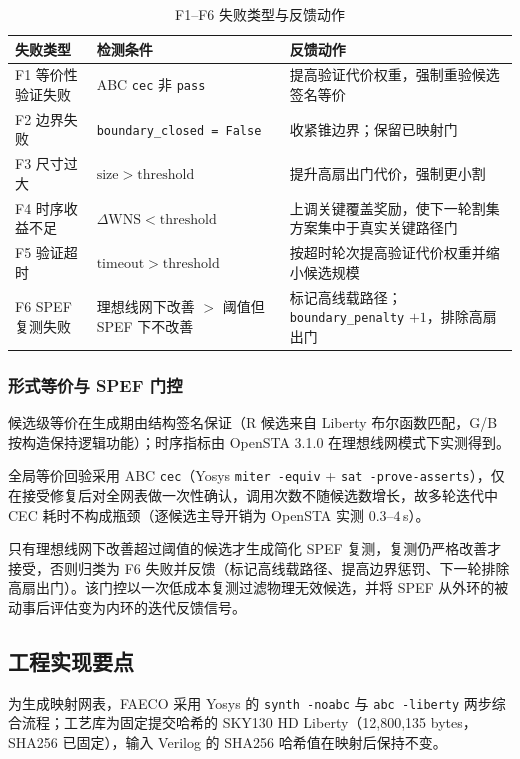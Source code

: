 \documentclass[journal]{IEEEtran}
\begin{document}
\begin{table}[!t]
\centering
\caption{F1--F6 失败类型与反馈动作}
\label{tab:failures}
\scriptsize
\setlength{\tabcolsep}{2pt}
\begin{tabular}{p{2.0cm}p{3.2cm}p{2.9cm}}
\toprule
\textbf{失败类型} & \textbf{检测条件} & \textbf{反馈动作} \\
\midrule
F1 等价性验证失败 & ABC \texttt{cec} 非 \texttt{pass} & 提高验证代价权重，强制重验候选签名等价 \\
F2 边界失败 & \texttt{boundary\_closed = False} & 收紧锥边界；保留已映射门 \\
F3 尺寸过大 & $\mathrm{size} > \mathrm{threshold}$ & 提升高扇出门代价，强制更小割 \\
F4 时序收益不足 & $\Delta\mathrm{WNS} < \mathrm{threshold}$ & 上调关键覆盖奖励，使下一轮割集方案集中于真实关键路径门 \\
F5 验证超时 & $\mathrm{timeout} > \mathrm{threshold}$ & 按超时轮次提高验证代价权重并缩小候选规模 \\
F6 SPEF 复测失败 & 理想线网下改善 $>$ 阈值但 SPEF 下不改善 & 标记高线载路径；\texttt{boundary\_penalty} $+1$，排除高扇出门 \\
\bottomrule
\end{tabular}
\end{table}

\subsubsection{形式等价与 SPEF 门控}
候选级等价在生成期由结构签名保证（R 候选来自 Liberty 布尔函数匹配，G/B 按构造保持逻辑功能）；时序指标由 OpenSTA 3.1.0 在理想线网模式下实测得到。

全局等价回验采用 ABC \texttt{cec}（Yosys \texttt{miter -equiv} + \texttt{sat -prove-asserts}），仅在接受修复后对全网表做一次性确认，调用次数不随候选数增长，故多轮迭代中 CEC 耗时不构成瓶颈（逐候选主导开销为 OpenSTA 实测 $0.3$--$4\,$s）。

只有理想线网下改善超过阈值的候选才生成简化 SPEF 复测，复测仍严格改善才接受，否则归类为 F6 失败并反馈（标记高线载路径、提高边界惩罚、下一轮排除高扇出门）。该门控以一次低成本复测过滤物理无效候选，并将 SPEF 从外环的被动事后评估变为内环的迭代反馈信号。

\subsection{工程实现要点}\label{sec:impl}

为生成映射网表，FAECO 采用 Yosys 的 \texttt{synth -noabc} 与 \texttt{abc -liberty} 两步综合流程；工艺库为固定提交哈希的 SKY130 HD Liberty（12,800,135 bytes，SHA256 已固定），输入 Verilog 的 SHA256 哈希值在映射后保持不变。
\end{document}
